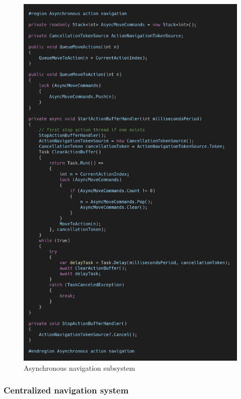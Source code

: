 \begin{figure}
\centering
\includegraphics[width=\textwidth]{figures/code/nav-arch/async-navigation.png}
\caption{Asynchronous navigation subsystem}
\label{fig:async.navigation}
\end{figure}


\subsubsection{Centralized navigation system}

